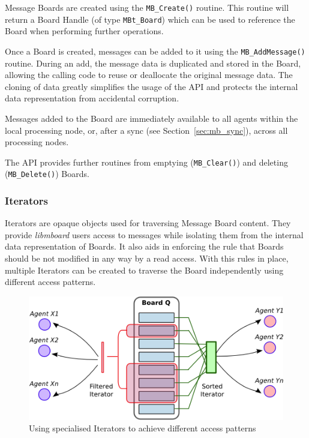 Message Boards are created using the \texttt{MB\_Create()} routine. This routine will return a Board Handle (of type \texttt{MBt\_Board}) which can be used to reference the Board when performing further operations.

Once a Board is created, messages can be added to it using the \texttt{MB\_AddMessage()} routine. During an add, the message data is duplicated and stored in the Board, allowing the calling code to reuse or deallocate the original message data. The cloning of data greatly simplifies the usage of the API and protects the internal data representation from accidental corruption. 

Messages added to the Board are immediately available to all agents within the local processing node, or, after a sync (see Section~\ref{sec:mb_sync}), across all processing nodes.

The API provides further routines from emptying (\texttt{MB\_Clear()}) and deleting  (\texttt{MB\_Delete()}) Boards.

\subsubsection{Iterators}
\label{sec:mb_iterators}

Iterators are opaque objects used for traversing Message Board content. They provide \textit{libmboard} users access to messages while isolating them from the internal data representation of Boards. It also aids in enforcing the rule that Boards should be not modified in any way by a read access. With this rules in place, multiple Iterators can be created to traverse the Board independently using different access patterns.

\begin{figure}[ht]
 \centering
  \includegraphics[scale=0.8]{iterator.png}
 \caption{Using specialised Iterators to achieve different access patterns}
 \label{fig:mb_iterators}
\end{figure}

